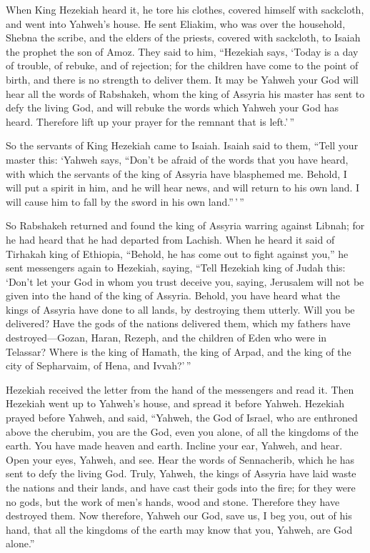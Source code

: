  When King Hezekiah heard it, he tore his clothes, covered
himself with sackcloth, and went into Yahweh's house.  He
sent Eliakim, who was over the household, Shebna the scribe, and the
elders of the priests, covered with sackcloth, to Isaiah the prophet the
son of Amoz.  They said to him, ``Hezekiah says, `Today is
a day of trouble, of rebuke, and of rejection; for the children have
come to the point of birth, and there is no strength to deliver them.
 It may be Yahweh your God will hear all the words of
Rabshakeh, whom the king of Assyria his master has sent to defy the
living God, and will rebuke the words which Yahweh your God has heard.
Therefore lift up your prayer for the remnant that is left.'\,''

 So the servants of King Hezekiah came to Isaiah.
 Isaiah said to them, ``Tell your master this: `Yahweh
says, ``Don't be afraid of the words that you have heard, with which the
servants of the king of Assyria have blasphemed me. 
Behold, I will put a spirit in him, and he will hear news, and will
return to his own land. I will cause him to fall by the sword in his own
land.''\,'\,''

 So Rabshakeh returned and found the king of Assyria
warring against Libnah; for he had heard that he had departed from
Lachish.  When he heard it said of Tirhakah king of
Ethiopia, ``Behold, he has come out to fight against you,'' he sent
messengers again to Hezekiah, saying,  ``Tell Hezekiah
king of Judah this: `Don't let your God in whom you trust deceive you,
saying, Jerusalem will not be given into the hand of the king of
Assyria.  Behold, you have heard what the kings of
Assyria have done to all lands, by destroying them utterly. Will you be
delivered?  Have the gods of the nations delivered them,
which my fathers have destroyed---Gozan, Haran, Rezeph, and the children
of Eden who were in Telassar?  Where is the king of
Hamath, the king of Arpad, and the king of the city of Sepharvaim, of
Hena, and Ivvah?'\,''

 Hezekiah received the letter from the hand of the
messengers and read it. Then Hezekiah went up to Yahweh's house, and
spread it before Yahweh.  Hezekiah prayed before Yahweh,
and said, ``Yahweh, the God of Israel, who are enthroned above the
cherubim, you are the God, even you alone, of all the kingdoms of the
earth. You have made heaven and earth.  Incline your ear,
Yahweh, and hear. Open your eyes, Yahweh, and see. Hear the words of
Sennacherib, which he has sent to defy the living God. 
Truly, Yahweh, the kings of Assyria have laid waste the nations and
their lands,  and have cast their gods into the fire; for
they were no gods, but the work of men's hands, wood and stone.
Therefore they have destroyed them.  Now therefore,
Yahweh our God, save us, I beg you, out of his hand, that all the
kingdoms of the earth may know that you, Yahweh, are God alone.''

